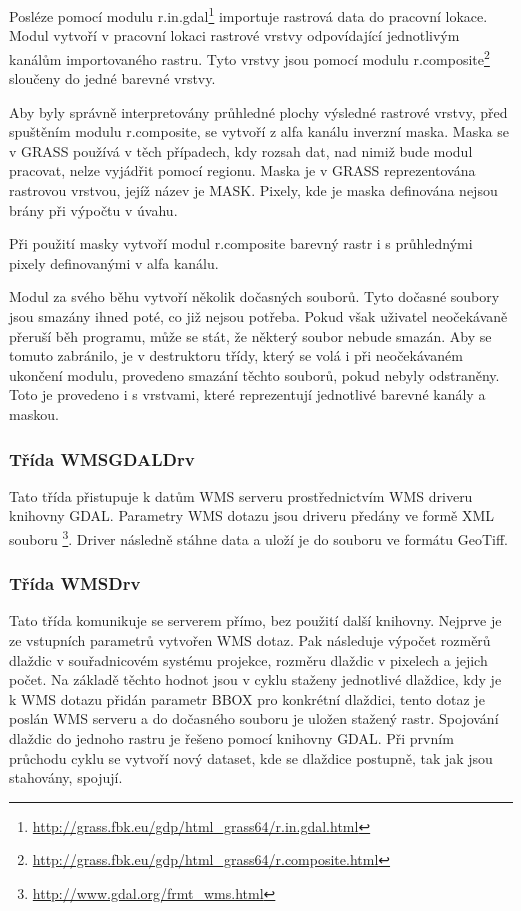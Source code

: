 \documentclass[a4paper,12pt]{article}
\begin{document}
Posléze pomocí modulu
r.in.gdal\footnote{\url{http://grass.fbk.eu/gdp/html_grass64/r.in.gdal.html}}
importuje rastrová data do pracovní lokace.  Modul vytvoří v pracovní
lokaci rastrové vrstvy odpovídající jednotlivým kanálům importovaného
rastru. Tyto vrstvy jsou pomocí modulu
r.composite\footnote{\url{http://grass.fbk.eu/gdp/html_grass64/r.composite.html}}
sloučeny do jedné barevné vrstvy.

Aby byly správně interpretovány průhledné plochy výsledné rastrové
vrstvy, před spuštěním modulu r.composite, se vytvoří z alfa kanálu
inverzní maska. Maska se v GRASS používá v těch případech, kdy rozsah
dat, nad nimiž bude modul pracovat, nelze vyjádřit pomocí
regionu. Maska je v GRASS reprezentována rastrovou vrstvou, jejíž
název je MASK. Pixely, kde je maska definována nejsou brány při
výpočtu v úvahu.

Při použití masky vytvoří modul r.composite barevný rastr i s
průhlednými pixely definovanými v alfa kanálu.

Modul za svého běhu vytvoří několik dočasných souborů. Tyto dočasné
soubory jsou smazány ihned poté, co již nejsou potřeba. Pokud však
uživatel neočekávaně přeruší běh programu, může se stát, že některý
soubor nebude smazán. Aby se tomuto zabránilo, je v destruktoru třídy,
který se volá i při neočekávaném ukončení modulu, provedeno smazání
těchto souborů, pokud nebyly odstraněny. Toto je provedeno i s
vrstvami, které reprezentují jednotlivé barevné kanály a maskou.

\subsubsection{Třída WMSGDALDrv}

Tato třída přistupuje k datům WMS serveru prostřednictvím WMS driveru
knihovny GDAL. Parametry WMS dotazu jsou driveru předány ve formě XML
souboru \footnote{\url{http://www.gdal.org/frmt_wms.html}}.  Driver
následně stáhne data a uloží je do souboru ve formátu GeoTiff.

\subsubsection{Třída WMSDrv}

Tato třída komunikuje se serverem přímo, bez použití další
knihovny. Nejprve je ze vstupních parametrů vytvořen WMS dotaz.  Pak
následuje výpočet rozměrů dlaždic v souřadnicovém systému projekce,
rozměru dlaždic v pixelech a jejich počet. Na základě těchto hodnot
jsou v cyklu staženy jednotlivé dlaždice, kdy je k WMS dotazu přidán
parametr BBOX pro konkrétní dlaždici, tento dotaz je poslán WMS
serveru a do dočasného souboru je uložen stažený rastr. Spojování
dlaždic do jednoho rastru je řešeno pomocí knihovny GDAL. Při prvním
průchodu cyklu se vytvoří nový dataset, kde se dlaždice postupně, tak
jak jsou stahovány, spojují.
\end{document}
